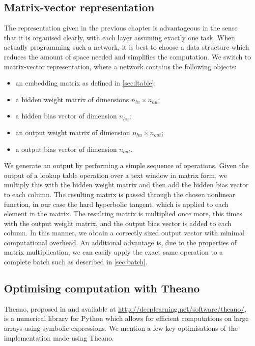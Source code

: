 \subsection{Matrix-vector representation}
\label{sec:matrixvectorreps}
The representation given in the previous chapter is advantageous in
the sense that it is organised clearly, with each layer assuming
exactly one task. When actually programming such a network, it is best
to choose a data structure which reduces the amount of space needed
and simplifies the computation. We switch to matrix-vector
representation, where a network contains the following objects:

\begin{itemize}
\item an embedding matrix as defined in \ref{sec:ltable};
\item a hidden weight matrix of dimensions $n_{in} \times n_{hu}$;
\item a hidden bias vector of dimension $n_{hu}$;
\item an output weight matrix of dimension $n_{hu} \times n_{out}$;
\item a output bias vector of dimension $n_{out}$.
\end{itemize}

We generate an output by performing a simple sequence of
operations. Given the output of a lookup table operation over a text
window in matrix form, we multiply this with the hidden weight matrix
and then add the hidden bias vector to each column. The resulting
matrix is passed through the chosen nonlinear function, in our case the
hard hyperbolic tangent, which is applied to each element in the
matrix. The resulting matrix is multiplied once more, this times with
the output weight matrix, and the output bias vector is added to each
column. In this manner, we obtain a correctly sized output vector with
minimal computational overhead. An additional advantage is, due to the
properties of matrix multiplication, we can easily apply the exact
same operation to a complete batch such as described in
\ref{sec:batch}.

\subsection{Optimising computation with Theano}
\label{sec:theano}
Theano, proposed in \cite{bergstra+al:2010-scipy} and available at
\url{http://deeplearning.net/software/theano/}, is a numerical library
for Python which allows for efficient computations on large arrays
using symbolic expressions. We mention a few key optimisations of the
implementation made using Theano.

